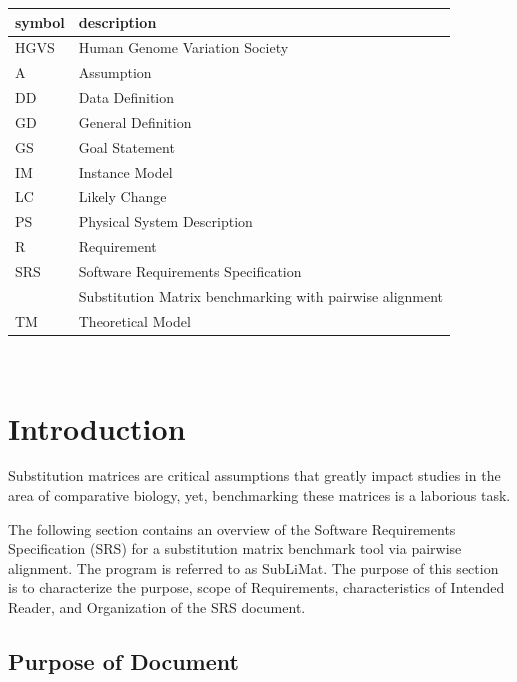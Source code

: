 \documentclass[12pt]{article}
\begin{document}
\renewcommand{\arraystretch}{1.2}
\begin{tabular}{l l} 
  \toprule		
  \textbf{symbol} & \textbf{description}\\
  \midrule 
  HGVS & Human Genome Variation Society\\
  A & Assumption\\
  DD & Data Definition\\
  GD & General Definition\\
  GS & Goal Statement\\
  IM & Instance Model\\
  LC & Likely Change\\
  PS & Physical System Description\\
  R & Requirement\\
  SRS & Software Requirements Specification\\
  \progname{} & Substitution Matrix benchmarking with pairwise alignment\\
  TM & Theoretical Model\\
  \bottomrule
\end{tabular}\\



\section{Introduction}

Substitution matrices are critical assumptions that greatly impact studies
in the area of comparative biology, yet, benchmarking these matrices is a 
laborious task.

The following section contains an overview of the Software Requirements Specification (SRS)
for a substitution matrix benchmark tool via pairwise alignment. The program is referred to 
as SubLiMat. The purpose of this section is to characterize the purpose, scope of Requirements, 
characteristics of Intended Reader, and Organization of the SRS document.


\subsection{Purpose of Document}
\end{document}

